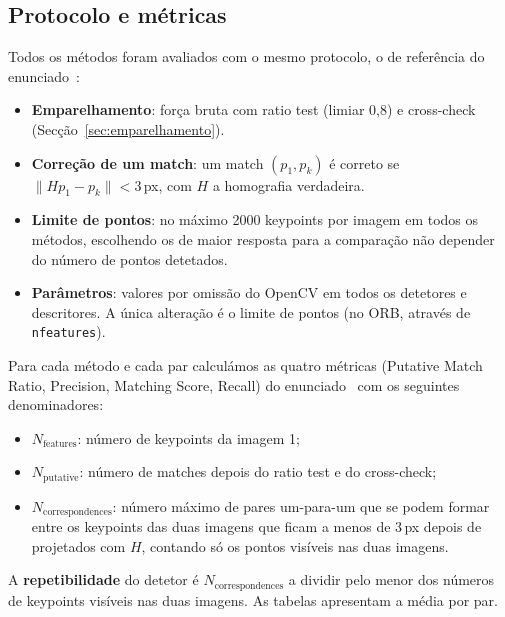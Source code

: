 \documentclass[11pt,a4paper]{article}
\newcommand{\px}{\,px}
\begin{document}
\subsection{Protocolo e métricas}
Todos os métodos foram avaliados com o mesmo protocolo, o de referência do enunciado~\cite{assignment1}:
\begin{itemize}
  \item \textbf{Emparelhamento}: força bruta com ratio test (limiar 0,8) e cross-check (Secção~\ref{sec:emparelhamento}).
  \item \textbf{Correção de um match}: um match $(p_1, p_k)$ é correto se $\lVert H p_1 - p_k\rVert < 3$\px, com $H$ a homografia verdadeira.
  \item \textbf{Limite de pontos}: no máximo 2000 keypoints por imagem em todos os métodos, escolhendo os de maior resposta para a comparação não depender do número de pontos detetados.
  \item \textbf{Parâmetros}: valores por omissão do OpenCV em todos os detetores e descritores. A única alteração é o limite de pontos (no ORB, através de \texttt{nfeatures}).
\end{itemize}

Para cada método e cada par calculámos as quatro métricas (Putative Match Ratio, Precision, Matching Score, Recall) do enunciado~\cite{heinly2012} com 
os seguintes denominadores:
\begin{itemize}
  \item $N_\text{features}$: número de keypoints da imagem 1;
  \item $N_\text{putative}$: número de matches depois do ratio test e do cross-check;
  \item $N_\text{correspondences}$: número máximo de pares um-para-um que se podem formar entre os
  keypoints das duas imagens que ficam a menos de 3\px{} depois de projetados com $H$, contando só os
  pontos visíveis nas duas imagens.
\end{itemize}
A \textbf{repetibilidade} do detetor é $N_\text{correspondences}$ a dividir pelo menor dos números de
keypoints visíveis nas duas imagens. As tabelas apresentam a média por par.
\end{document}
